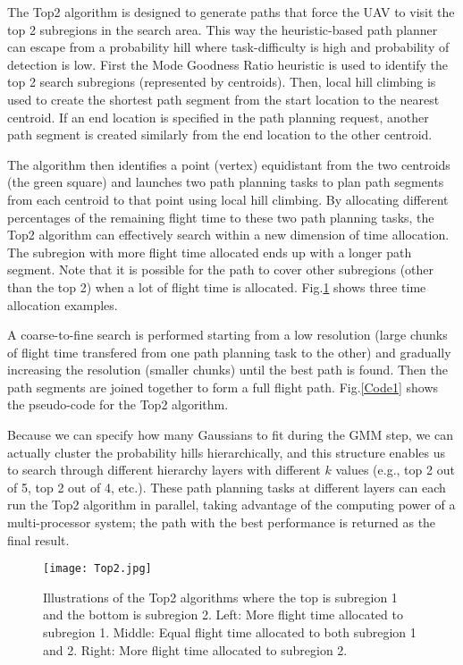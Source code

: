 The Top2 algorithm is designed to generate paths that force the UAV to visit the top 2 subregions in the search area. This way the heuristic-based path planner can escape from a probability hill where task-difficulty is high and probability of detection is low. First the Mode Goodness Ratio heuristic is used to identify the top 2 search subregions (represented by centroids). Then, local hill climbing is used to create the shortest path segment from the start location to the nearest centroid. If an end location is specified in the path planning request, another path segment is created similarly from the end location to the other centroid. 

The algorithm then identifies a point (vertex) equidistant from the two centroids (the green square) and launches two path planning tasks to plan path segments from each centroid to that point using local hill climbing. By allocating different percentages of the remaining flight time to these two path planning tasks, the Top2 algorithm can effectively search within a new dimension of time allocation. The subregion with more flight time allocated ends up with a longer path segment. Note that it is possible for the path to cover other subregions (other than the top 2) when a lot of flight time is allocated. Fig.\ref{Top2} shows three time allocation examples. 

A coarse-to-fine search is performed starting from a low resolution (large chunks of flight time transfered from one path planning task to the other) and gradually increasing the resolution (smaller chunks) until the best path is found. Then the path segments are joined together to form a full flight path. Fig.\ref{Code1} shows the pseudo-code for the Top2 algorithm.

Because we can specify how many Gaussians to fit during the GMM step, we can actually cluster the probability hills hierarchically, and this structure enables us to search through different hierarchy layers with different $k$ values (e.g., top 2 out of 5, top 2 out of 4, etc.). These path planning tasks at different layers can each run the Top2 algorithm in parallel, taking advantage of the computing power of a multi-processor system; the path with the best performance is returned as the final result.
\begin{figure}
\centering
\texttt{[image: Top2.jpg]}
\caption[Illustrations of the Top2 algorithms]{Illustrations of the Top2 algorithms where the top is subregion 1 and the bottom is subregion 2. Left: More flight time allocated to subregion 1. Middle: Equal flight time allocated to both subregion 1 and 2. Right: More flight time allocated to subregion 2.}
\label{Top2}
\end{figure}

